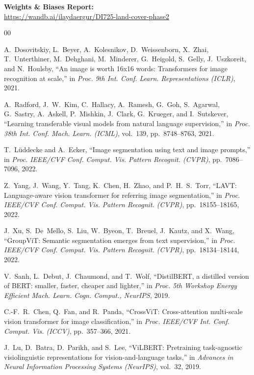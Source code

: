 \documentclass[conference]{IEEEtran}
\begin{document}
\textbf{Weights \& Biases Report:}\\
\url{https://wandb.ai/ilaydaergur/DI725-land-cover-phase2}

\begin{thebibliography}{00}

A.~Dosovitskiy, L.~Beyer, A.~Kolesnikov, D.~Weissenborn, X.~Zhai, T.~Unterthiner,
M.~Dehghani, M.~Minderer, G.~Heigold, S.~Gelly, J.~Uszkoreit, and N.~Houlsby,
``An image is worth 16x16 words: Transformers for image recognition at scale,''
in \textit{Proc. 9th Int. Conf. Learn. Representations (ICLR)}, 2021.

A.~Radford, J.~W.~Kim, C.~Hallacy, A.~Ramesh, G.~Goh, S.~Agarwal, G.~Sastry,
A.~Askell, P.~Mishkin, J.~Clark, G.~Krueger, and I.~Sutskever,
``Learning transferable visual models from natural language supervision,''
in \textit{Proc. 38th Int. Conf. Mach. Learn. (ICML)}, vol.~139, pp.~8748--8763, 2021.

T.~L\"{u}ddecke and A.~Ecker,
``Image segmentation using text and image prompts,''
in \textit{Proc. IEEE/CVF Conf. Comput. Vis. Pattern Recognit. (CVPR)},
pp.~7086--7096, 2022.

Z.~Yang, J.~Wang, Y.~Tang, K.~Chen, H.~Zhao, and P.~H.~S.~Torr,
``LAVT: Language-aware vision transformer for referring image segmentation,''
in \textit{Proc. IEEE/CVF Conf. Comput. Vis. Pattern Recognit. (CVPR)},
pp.~18155--18165, 2022.

J.~Xu, S.~De~Mello, S.~Liu, W.~Byeon, T.~Breuel, J.~Kautz, and X.~Wang,
``GroupViT: Semantic segmentation emerges from text supervision,''
in \textit{Proc. IEEE/CVF Conf. Comput. Vis. Pattern Recognit. (CVPR)},
pp.~18134--18144, 2022.

V.~Sanh, L.~Debut, J.~Chaumond, and T.~Wolf,
``DistilBERT, a distilled version of BERT: smaller, faster, cheaper and lighter,''
in \textit{Proc. 5th Workshop Energy Efficient Mach. Learn. Cogn. Comput., NeurIPS},
2019.

C.-F.~R.~Chen, Q.~Fan, and R.~Panda,
``CrossViT: Cross-attention multi-scale vision transformer for image classification,''
in \textit{Proc. IEEE/CVF Int. Conf. Comput. Vis. (ICCV)}, pp.~357--366, 2021.

J.~Lu, D.~Batra, D.~Parikh, and S.~Lee,
``ViLBERT: Pretraining task-agnostic visiolinguistic representations for
vision-and-language tasks,''
in \textit{Advances in Neural Information Processing Systems (NeurIPS)}, vol.~32, 2019.

\end{thebibliography}
\end{document}
